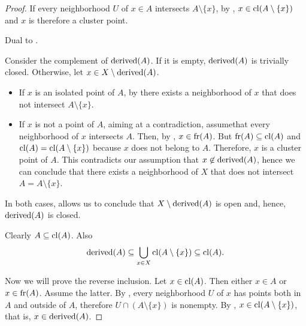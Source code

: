 \begin{proof}
   If every neighborhood \( U \) of \( x \in A \) intersects \( A \setminus \{ x \} \), by , \( x \in \operatorname{cl}(A \setminus \{ x \}) \) and \( x \) is therefore a cluster point.

   Dual to .

   Consider the complement of \( \operatorname{derived}(A) \). If it is empty, \( \operatorname{derived}(A) \) is trivially closed. Otherwise, let \( x \in X \setminus \operatorname{derived}(A) \).

  \begin{itemize}
    \item If \( x \) is an isolated point of \( A \), by  there exists a neighborhood of \( x \) that does not intersect \( A \setminus \{ x \} \).
    \item If \( x \) is not a point of \( A \), aiming at a contradiction, assume\DNE that every neighborhood of \( x \) intersects \( A \). Then, by , \( x \in \operatorname{fr}(A) \). But \( \operatorname{fr}(A) \subseteq \operatorname{cl}(A) \) and \( \operatorname{cl}(A) = \operatorname{cl}(A \setminus \{ x \}) \) because \( x \) does not belong to \( A \). Therefore, \( x \) is a cluster point of \( A \). This contradicts our assumption that \( x \not\in \operatorname{derived}(A) \), hence we can conclude that there exists a neighborhood of \( X \) that does not intersect \( A = A \setminus \{ x \} \).
  \end{itemize}

  In both cases,  allows us to conclude that \( X \setminus \operatorname{derived}(A) \) is open and, hence, \( \operatorname{derived}(A) \) is closed.

   Clearly \( A \subseteq \operatorname{cl}(A) \). Also
  \begin{equation*}
    \operatorname{derived}(A) \subseteq \bigcup_{x \in X} \operatorname{cl}(A \setminus \{ x \}) \subseteq \operatorname{cl}(A).
  \end{equation*}

  Now we will prove the reverse inclusion. Let \( x \in \operatorname{cl}(A) \). Then either \( x \in A \) or \( x \in \operatorname{fr}(A) \). Assume the latter. By , every neighborhood \( U \) of \( x \) has points both in \( A \) and outside of \( A \), therefore \( U \cap (A \setminus \{ x \}) \) is nonempty. By , \( x \in \operatorname{cl}(A \setminus \{ x \}) \), that is, \( x \in \operatorname{derived}(A) \).


\end{proof}
